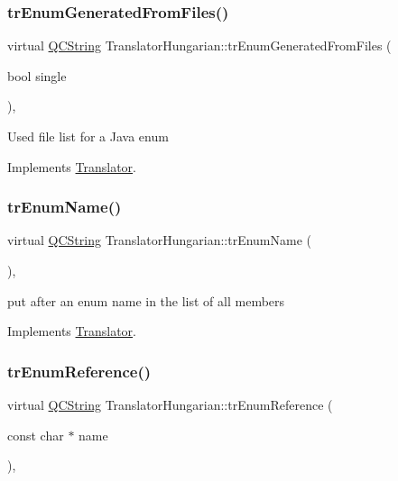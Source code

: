 \subsubsection{\texorpdfstring{trEnumGeneratedFromFiles()}{trEnumGeneratedFromFiles()}}
{\footnotesize\ttfamily virtual \mbox{\hyperlink{class_q_c_string}{Q\+C\+String}} Translator\+Hungarian\+::tr\+Enum\+Generated\+From\+Files (\begin{DoxyParamCaption}\item[{bool}]{single }\end{DoxyParamCaption})\hspace{0.3cm}{\ttfamily [inline]}, {\ttfamily [virtual]}}

Used file list for a Java enum 

Implements \mbox{\hyperlink{class_translator}{Translator}}.

\mbox{\label{class_translator_hungarian_a66e907e4819a8c525cd2b9a60c2bcf7c}} 
\subsubsection{\texorpdfstring{trEnumName()}{trEnumName()}}
{\footnotesize\ttfamily virtual \mbox{\hyperlink{class_q_c_string}{Q\+C\+String}} Translator\+Hungarian\+::tr\+Enum\+Name (\begin{DoxyParamCaption}{ }\end{DoxyParamCaption})\hspace{0.3cm}{\ttfamily [inline]}, {\ttfamily [virtual]}}

put after an enum name in the list of all members 

Implements \mbox{\hyperlink{class_translator}{Translator}}.

\mbox{\label{class_translator_hungarian_ab56f5fb807667927759c33f09bfc38bf}} 
\subsubsection{\texorpdfstring{trEnumReference()}{trEnumReference()}}
{\footnotesize\ttfamily virtual \mbox{\hyperlink{class_q_c_string}{Q\+C\+String}} Translator\+Hungarian\+::tr\+Enum\+Reference (\begin{DoxyParamCaption}\item[{const char $\ast$}]{name }\end{DoxyParamCaption})\hspace{0.3cm}{\ttfamily [inline]}, {\ttfamily [virtual]}}

